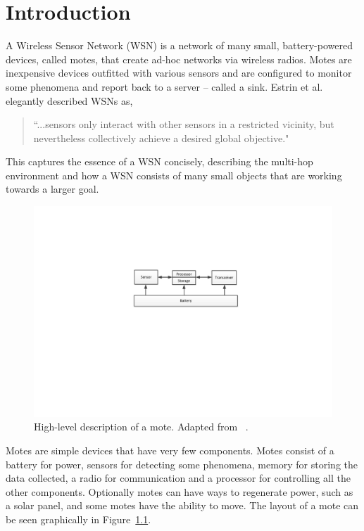 \chapter{Introduction}
\label{ch:ch1}

A Wireless Sensor Network (WSN) is a network of many small, battery-powered 
devices, called motes,  that create ad-hoc networks via wireless radios.  
Motes are inexpensive devices outfitted with various sensors and are configured to 
monitor some phenomena and report back to a server -- called a sink. 
Estrin et al.~\cite{nextCentury} 
elegantly described WSNs as,
\begin{quote}
	``...sensors only interact with other sensors in a restricted 
	vicinity, but nevertheless collectively achieve a desired 
	global objective."
\end{quote}
This captures the essence of a WSN concisely, describing the 
multi-hop environment and how a WSN consists of many small objects 
that are working towards a larger goal.

\begin{figure}[htbp]
	\centering
		\includegraphics[width=4.5in]{images/intro/mote.pdf}
	\caption{High-level description of a mote. Adapted from ~\cite{wsnSurvey}.}
	\label{fig:images_intro_mote}
\end{figure}

Motes are simple devices that have very few components. 
Motes consist of a battery for power, sensors for
detecting some phenomena, memory for storing the
data collected, a radio for communication and a processor for 
controlling all the other components. Optionally motes
can have ways to regenerate power, such as a solar panel, and 
some motes have the ability to move. The layout of a mote can be seen
graphically in Figure~\ref{fig:images_intro_mote}. 




